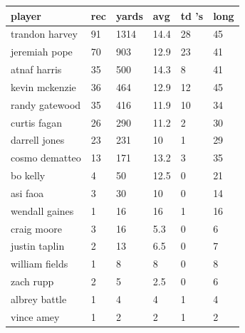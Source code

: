 \documentclass{article}
\begin{document}
\begin{tabular}{llllll}
\toprule
player & rec & yards & avg & td 's & long \\
\midrule
trandon harvey & 91 & 1314 & 14.4 & 28 & 45 \\
jeremiah pope & 70 & 903 & 12.9 & 23 & 41 \\
atnaf harris & 35 & 500 & 14.3 & 8 & 41 \\
kevin mckenzie & 36 & 464 & 12.9 & 12 & 45 \\
randy gatewood & 35 & 416 & 11.9 & 10 & 34 \\
curtis fagan & 26 & 290 & 11.2 & 2 & 30 \\
darrell jones & 23 & 231 & 10 & 1 & 29 \\
cosmo dematteo & 13 & 171 & 13.2 & 3 & 35 \\
bo kelly & 4 & 50 & 12.5 & 0 & 21 \\
asi faoa & 3 & 30 & 10 & 0 & 14 \\
wendall gaines & 1 & 16 & 16 & 1 & 16 \\
craig moore & 3 & 16 & 5.3 & 0 & 6 \\
justin taplin & 2 & 13 & 6.5 & 0 & 7 \\
william fields & 1 & 8 & 8 & 0 & 8 \\
zach rupp & 2 & 5 & 2.5 & 0 & 6 \\
albrey battle & 1 & 4 & 4 & 1 & 4 \\
vince amey & 1 & 2 & 2 & 1 & 2 \\
\bottomrule
\end{tabular}
\end{document}
